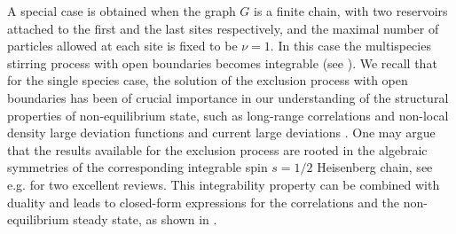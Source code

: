\documentclass[10pt]{article}
\numberwithin{equation}{section}
\numberwithin{equation}{subsection}
\begin{document}
A special case is obtained when the graph $G$ is a finite chain, 
with two reservoirs attached to the first and the last sites respectively, 
and the maximal number of particles allowed at each site is fixed to be $\nu=1$.
In this case the multispecies stirring process with open boundaries 
becomes integrable (see \cite{vanicat2017exact}). 
%
% 
We recall that for the single species case,  the solution of the exclusion process with open boundaries \cite{derrida1993exact,1993JSP....72..277S} has been of crucial importance in our understanding of the structural properties of non-equilibrium state, such as long-range correlations \cite{spohn1983long} and non-local density large deviation functions \cite{derrida2007non,derrida1998exact} and current large deviations \cite{mallick2022exact,bodineau2005current}. One may argue that the results available for the exclusion process are rooted in the algebraic symmetries of the corresponding integrable spin $s=1/2$ Heisenberg chain, see e.g. \cite{schutzManyBody,SSEPReviewRagoucy} for two excellent reviews.
%
This integrability property can be combined with duality and leads to closed-form expressions for the correlations and the non-equilibrium steady state, as shown in \cite{frassek2020eigenstates,frassek2020duality}.
\end{document}
